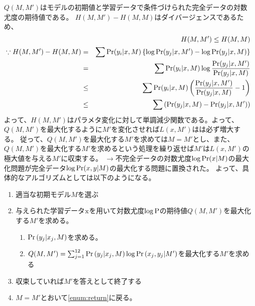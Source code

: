 \documentclass[dvipdfmx,titlepage, a4paper]{jsarticle}%
\begin{document}
$Q(M, M')$はモデルの初期値と学習データで条件づけられた完全データの対数尤度の期待値である。
$H(M, M') - H(M, M)$はダイバージェンスであるため、
\begin{eqnarray*}
	&&H(M, M') \leq H(M, M)\\
	\because H(M, M') - H(M, M) &=& \sum {\rm Pr}(y_{i}|x, M)\left\{ \log {\rm Pr}(y_{j}| x, M') -  \log {\rm Pr}(y_{j}| x, M)\right\}\\
								&=& \sum {\rm Pr}(y_{i}|x, M)\log \frac{{\rm Pr}(y_{j}| x, M')}{{\rm Pr}(y_{j}| x, M)}\\
								&\leq& \sum {\rm Pr}(y_{i}|x, M)\left(\frac{{\rm Pr}(y_{j}| x, M')}{{\rm Pr}(y_{j}| x, M)} - 1\right) \\
								&\leq& \sum \left({\rm Pr}(y_{j}| x, M) - {\rm Pr}(y_{j}| x, M')\right)
\end{eqnarray*}
よって、$H(M, M')$はパラメタ変化に対して単調減少関数である。よって、$Q(M, M')$を最大化するように$M'$を変化させれば$L(x, M')$はは必ず増大する。
従って、$Q(M, M')$を最大化する$M'$を求めては$M = M'$とし、また、$Q(M, M')$を最大化する$M'$を求めるという処理を繰り返せば$M'$は$L(x, M')$の極大値を与える$M'$に収束する。
$\rightarrow$不完全データの対数尤度$\log {\rm Pr}(x|M)$の最大化問題が完全データ$\log {\rm Pr}(x, y|M)$の最大化する問題に置換された。
よって、具体的なアルゴリズムとしては以下のようになる。
\begin{enumerate}
	\item 適当な初期モデル$M$を選ぶ
	\item 与えられた学習データ${\rm x}$を用いて対数尤度$\log {\rm P}$の期待値$Q(M, M')$を最大化する$M'$を求める。\label{enum:return}
	\begin{enumerate}[{2}-1]
		\item ${\rm Pr}\left(y_{j}|x_{j}, M\right)$を求める。
		\item $Q(M, M') = \sum_{j = 1}^{12}{\rm Pr}\left(y_{j} | x_{j}, M\right) \log {\rm Pr}\left(x_{j}, y_{j} | M'\right)$を最大化する$M'$を求める
	\end{enumerate}
	\item 収束していれば$M'$を答えとして終了する
	\item $M = M'$とおいて\ref{enum:return}に戻る。
\end{enumerate}
\end{document}
